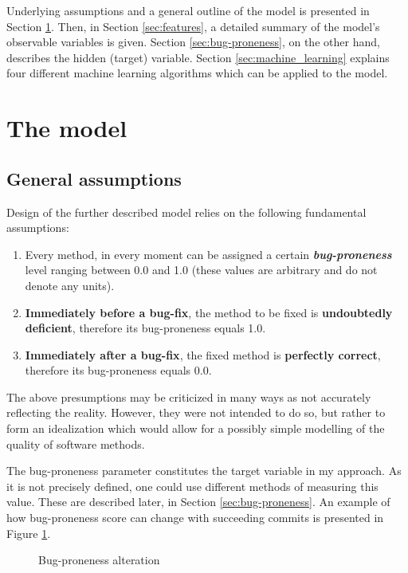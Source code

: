 \documentclass{pracamgr}
\begin{document}
Underlying assumptions and a general outline of the model is presented in Section \ref{sec:model}. Then, in Section \ref{sec:features}, a detailed summary of the model's observable variables is given. Section \ref{sec:bug-proneness}, on the other hand, describes the hidden (target) variable. Section \ref{sec:machine_learning} explains four different machine learning algorithms which can be applied to the model.

\section{The model}
\label{sec:model}

\subsection{General assumptions}
\label{sec:general_assumptions}
Design of the further described model relies on the following fundamental assumptions:
\begin{enumerate}[label=(A\arabic*)]
	\item Every method, in every moment can be assigned a certain \textbf{\emph{bug-proneness}} level ranging between 0.0 and 1.0 (these values are arbitrary and do not denote any units).
	\item \textbf{Immediately before a bug-fix}, the method to be fixed is \textbf{undoubtedly deficient}, therefore its bug-proneness equals 1.0.
	\item \textbf{Immediately after a bug-fix}, the fixed method is \textbf{perfectly correct}, therefore its bug-proneness equals 0.0. 
\end{enumerate}
The above presumptions may be criticized in many ways as not accurately reflecting the reality. However, they were not intended to do so, but rather to form an idealization which would allow for a possibly simple modelling of the quality of software methods.

The bug-proneness parameter constitutes the target variable in my approach. As it is not precisely defined, one could use different methods of measuring this value. These are described later, in Section \ref{sec:bug-proneness}. An example of how bug-proneness score can change with succeeding commits is presented in Figure \ref{fig:bug_proneness}.

\begin{figure}[h]
\centering

\caption{Bug-proneness alteration}
\label{fig:bug_proneness}
\end{figure}
\end{document}
